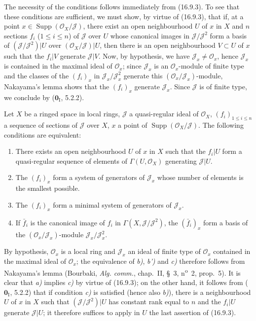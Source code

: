 The necessity of the conditions follows immediately from (16.9.3). To see that
these conditions are sufficient, we must show, by virtue of (16.9.3), that if,
at a point $x\in\operatorname{Supp}(\mathcal{O}_X/\mathscr{J})$, there exist
an open neighbourhood $U$ of $x$ in $X$ and $n$ sections $f_i$
($1\leq i\leq n$) of $\mathscr{J}$ over $U$ whose canonical images in
$\mathscr{J}/\mathscr{J}^2$ form a basis of
$(\mathscr{J}/\mathscr{J}^2)|U$ over
$(\mathcal{O}_X/\mathscr{J})|U$, then there is an open neighbourhood
$V\subset U$ of $x$ such that the $f_i|V$ generate $\mathscr{J}|V$. Now, by
hypothesis, we have $\mathscr{J}_x\neq\mathcal{O}_x$, hence $\mathscr{J}_x$
is contained in the maximal ideal of $\mathcal{O}_x$; since $\mathscr{J}_x$
is an $\mathcal{O}_x$-module of finite type and the classes of the $(f_i)_x$
in $\mathscr{J}_x/\mathscr{J}_x^2$ generate this
$(\mathcal{O}_x/\mathscr{J}_x)$-module, Nakayama's lemma shows that the
$(f_i)_x$ generate $\mathscr{J}_x$. Since $\mathscr{J}$ is of finite type,
we conclude by ($\mathbf{0}_{\mathrm I}$, 5.2.2).

\begin{corollary}[16.9.5]
\label{IV.16.9.5}
Let $X$ be a ringed space in local rings, $\mathscr{J}$ a quasi-regular
ideal of $\mathcal{O}_X$, $(f_i)_{1\leq i\leq n}$ a sequence of
sections of $\mathscr{J}$ over $X$,
$x$ a point of $\operatorname{Supp}(\mathcal{O}_X/\mathscr{J})$. The
following conditions are equivalent:
\begin{enumerate}
  \item[\textup{a)}] There exists an open neighbourhood $U$ of $x$ in $X$ such that
  the $f_i|U$ form a quasi-regular sequence of elements of
  $\Gamma(U,\mathcal{O}_X)$ generating $\mathscr{J}|U$.
  \item[\textup{b)}] The $(f_i)_x$ form a system of generators of
  $\mathscr{J}_x$ whose number of elements is the smallest possible.
  \item[\textup{b$'$)}] The $(f_i)_x$ form a minimal system of generators of
  $\mathscr{J}_x$.
  \item[\textup{c)}] If $\bar f_i$ is the canonical image of $f_i$ in
  $\Gamma(X,\mathscr{J}/\mathscr{J}^2)$, the $(\bar f_i)_x$ form a basis
  of the $(\mathcal{O}_x/\mathscr{J}_x)$-module
  $\mathscr{J}_x/\mathscr{J}_x^2$.
\end{enumerate}
\end{corollary}

By hypothesis, $\mathcal{O}_x$ is a local ring and $\mathscr{J}_x$ an ideal
of finite type of $\mathcal{O}_x$ contained in the maximal ideal of
$\mathcal{O}_x$; the equivalence of \emph{b)}, \emph{b')} and \emph{c)} therefore follows from
Nakayama's lemma (Bourbaki, \emph{Alg. comm.}, chap.~II, §~3,
n\textsuperscript{o}~2, prop.~5). It is clear that \emph{a)} implies \emph{c)} by virtue
of (16.9.3); on the other hand, it follows from ($\mathbf{0}_{\mathrm I}$, 5.2.2)
that if condition \emph{c)} is satisfied (hence also \emph{b)}), there is a neighbourhood
$U$ of $x$ in $X$ such that $(\mathscr{J}/\mathscr{J}^2)|U$ has constant rank
equal to $n$ and the $f_i|U$ generate $\mathscr{J}|U$; it therefore suffices
to apply in $U$ the last assertion of (16.9.3).

